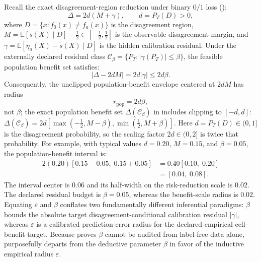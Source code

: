 Recall the exact disagreement-region reduction under binary $0/1$ loss ():
\begin{equation}
 \Delta = 2d(M + \gamma), \qquad d = P_T(D) > 0,
 \label{eq:app-reduction}
\end{equation}
where $D = \{x : f_0(x) \neq f_a(x)\}$ is the disagreement region,
$M = \mathbb E[s(X) \mid D] - \frac{1}{2} \in [-\frac{1}{2}, \frac{1}{2}]$ is the observable disagreement margin,
and $\gamma = \mathbb E[\eta_a(X) - s(X) \mid D]$ is the hidden calibration residual. Under the externally declared
residual class $\mathcal C_\beta = \{P_T : |\gamma(P_T)| \le \beta\}$, the feasible population benefit set satisfies:
\begin{equation}
 |\Delta - 2dM| = 2d|\gamma| \le 2d\beta.
\end{equation}
Consequently, the unclipped population-benefit envelope centered at $2dM$ has radius
\begin{equation}
 r_{\mathrm{pop}} = 2d\beta,
\end{equation}
not $\beta$; the exact population benefit set $\Delta(\mathcal C_\beta)$ in 
includes clipping to $[-d, d]$: $\Delta(\mathcal C_\beta) = 2d[\max(-\tfrac12, M-\beta), \min(\tfrac12, M+\beta)]$.
Here $d = P_T(D) \in (0, 1]$ is the disagreement probability, so the scaling factor $2d \in (0, 2]$ is twice that probability.
For example, with typical values $d = 0.20$, $M = 0.15$, and $\beta = 0.05$, the population-benefit interval is:
\begin{align*}
 2(0.20)[0.15 - 0.05, \; 0.15 + 0.05] &= 0.40[0.10, \; 0.20] \\
 &= [0.04, \; 0.08].
\end{align*}
The interval center is $0.06$ and its half-width on the risk-reduction scale is $0.02$. The declared residual
budget is $\beta = 0.05$, whereas the benefit-scale radius is $0.02$. Equating $\varepsilon$ and $\beta$
conflates two fundamentally different inferential paradigms: $\beta$ bounds the absolute target disagreement-conditional calibration residual $|\gamma|$, whereas $\varepsilon$ is a calibrated prediction-error radius for the declared empirical cell-benefit target. Because  proves $\beta$ cannot be audited
from label-free data alone, \KGA purposefully departs from the deductive parameter $\beta$ in favor of the inductive
empirical radius $\varepsilon$.

